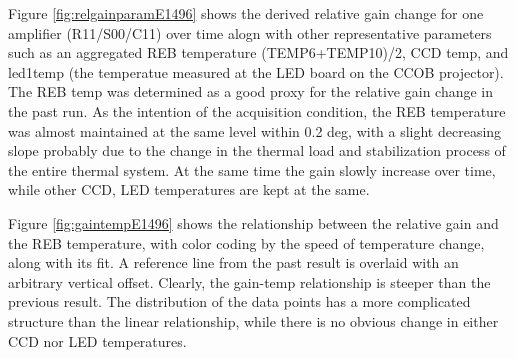 Figure \ref{fig:relgainparamE1496} shows the derived 
 relative gain change for one amplifier (R11/S00/C11) over time alogn with other representative parameters such as an aggregated REB temperature (TEMP6+TEMP10)/2, CCD temp, and led1temp (the temperatue measured at the LED board on the CCOB projector). The REB temp was determined as a good proxy for the relative gain change in the past run.
 As the intention of the acquisition condition, the REB temperature was almost maintained at the same level within 0.2 deg, with a slight decreasing slope probably due to the change in the thermal load and stabilization process of the entire thermal system.
 At the same time the gain slowly increase over time, while other CCD, LED temperatures are kept at the same.

 Figure \ref{fig:gaintempE1496} shows the relationship between the relative gain and the REB temperature, with color coding by the speed of temperature change, along with its fit. A reference line from the past result is overlaid with an arbitrary vertical offset. Clearly, the gain-temp relationship is steeper than the previous result. The distribution of the data points has a more complicated structure than the linear relationship, while there is no obvious change in either CCD nor LED temperatures. 



